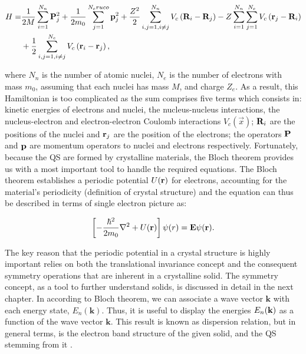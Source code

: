 \begin{equation}
\begin{split}
	H  =  &\dfrac{1}{2M}\sum\limits_{i=1}^{N_{n}} \mathrm{\bf P}_{j}^{2} + \dfrac{1}{2m_{0}} \sum\limits_{j=1}^{N_{e}
	ruco} \mathrm{\bf p}_{j}^{2} + \dfrac{Z^{2}}{2} \sum\limits_{i,j=1,i\neq j}^{N_{n}} V_{c}\left(\mathrm{\bf R}_{i}-\mathrm{\bf R}_{j}\right)-Z\sum\limits_{i=1}^{N_{n}}\sum\limits_{j=1}^{N_{e}}V_{c}\left(\mathrm{\bf r}_{j}-\mathrm{\bf R}_{i}\right) \\
	   & + \dfrac{1}{2} \sum\limits_{i,j=1,i\neq j}^{N_{e}} V_{c} \left(\mathrm{\bf r}_{i}-\mathrm{\bf r}_{j}\right),
\end{split}
\label{eq:chapter-1-solid-hamiltonian}
\end{equation}

where  $N_{n}$ is the number of atomic nuclei, $N_{e}$ is the number of electrons with mass $m_{0}$, assuming that each nuclei has mass $M$, and charge $Z_{e}$. As a result, this Hamiltonian is too complicated as the sum comprises five terms which consists in: kinetic energies of electrons and nuclei, the nucleus-nucleus interactions, the nucleus-electron and electron-electron Coulomb interactions $V_{c}\left(\vec{x}\right)$; $\mathrm{\bf R}_{i}$ are the positions of the nuclei and $\mathrm{\bf r}_{j}$ are the position of the electrons; the operators $\mathrm{\bf P}$ and $\mathrm{\bf p}$ are momentum operators to nuclei and electrons respectively\cite{alloul2010introduction}.
Fortunately, because  the \gls{QS} are formed by crystalline materials, the Bloch theorem provides us with a most important tool to handle the required equations. The Bloch theorem establishes a periodic potential $U(\displaystyle\mathrm{\bf r})$ for electrons, accounting for the material's periodicity (definition of crystal structure) and the \sch equation can thus be described in terms of single electron picture as:  


\begin{equation}
	\left[-\dfrac{\hbar^2}{2m_{0}}\nabla^2 + U(\displaystyle\mathrm{\bf r})\right]\psi (r)=\displaystyle\mathrm{\bf E}\psi(\displaystyle\mathrm{\bf r}).
	\label{eq:chapter-1-first-sch}
\end{equation}

The key reason that the periodic potential in a crystal structure is highly important relies on both the translational invariance concept and the consequent symmetry operations that are inherent in a crystalline solid. The symmetry concept, as a tool to further understand solids, is discussed in detail in the next chapter. In according to Bloch theorem, we can associate a wave vector $\boldsymbol{k}$ with each energy state, $E_{n}(\boldsymbol{k})$. Thus, it is useful to display the energies $E_{n}(\bf{k})$ as a function of the wave vector $\boldsymbol{k}$. This result is known as dispersion relation, but in general terms, is the electron band structure of the given solid, and the \gls{QS} stemming from it \cite{piprek2017handbook}.   


